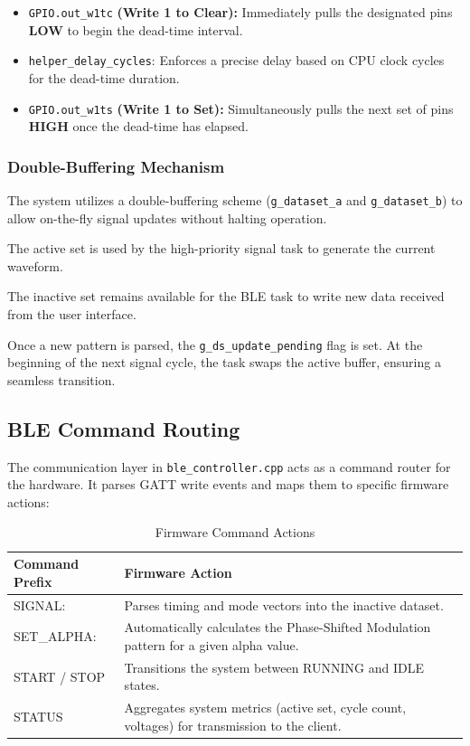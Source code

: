 \begin{itemize}
    \item \verb|GPIO.out_w1tc| \textbf{(Write 1 to Clear):}  Immediately pulls the designated pins 
            \textbf{LOW} to begin the dead-time interval.
    \item \verb|helper_delay_cycles|: Enforces a precise delay based on CPU clock cycles for the 
            dead-time duration.
    \item \verb|GPIO.out_w1ts| \textbf{(Write 1 to Set):} Simultaneously pulls the next set of 
            pins \textbf{HIGH} once the dead-time has elapsed.
\end{itemize}

\subsubsection{Double-Buffering Mechanism}

The system utilizes a double-buffering scheme (\verb|g_dataset_a| and \verb|g_dataset_b|) to allow on-the-fly 
signal updates without halting operation.

The active set is used by the high-priority signal task to generate the current waveform.

The inactive set remains available for the BLE task to write new data received from the user interface.

Once a new pattern is parsed, the \verb|g_ds_update_pending| flag is set. At the beginning of the next 
signal cycle, the task swaps the active buffer, ensuring a seamless transition.

\subsection{BLE Command Routing}

The communication layer in \verb|ble_controller.cpp| acts as a command router for the hardware. It parses 
GATT write events and maps them to specific firmware actions:


\begin{table}[ht]
    \centering
    \caption{Firmware Command Actions}
    \begin{tabular}{lp{8cm}} %
        \toprule
        \textbf{Command Prefix} & \textbf{Firmware Action} \\
        \midrule
        SIGNAL: & Parses timing and mode vectors into the inactive dataset. \\
        \addlinespace
        SET\_ALPHA: & Automatically calculates the Phase-Shifted Modulation pattern for a given alpha value. \\
        \addlinespace
        START / STOP & Transitions the system between RUNNING and IDLE states. \\
        \addlinespace
        STATUS & Aggregates system metrics (active set, cycle count, voltages) for transmission to the client. \\
        \bottomrule
    \end{tabular}
    \label{table:firmware_commands}
\end{table}

